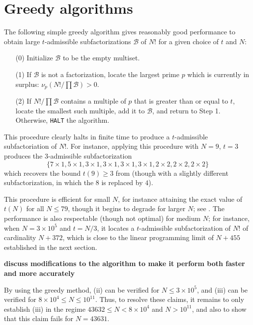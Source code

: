 \documentclass[12pt,a4paper,reqno]{amsart}
\numberwithin{equation}{section}
\theoremstyle{plain}
\theoremstyle{definition}
\newcommand\tuple{{\mathcal B}}
\begin{document}
\section{Greedy algorithms}\label{greedy-sec}

The following simple greedy algorithm gives reasonably good performance to obtain large $t$-admissible subfactorizations $\tuple$ of $N!$ for a given choice of $t$ and $N$:

\begin{enumerate}
\item[(0)] Initialize $\tuple$ to be the empty multiset. 
\item[(1)] If $\tuple$ is not a factorization, locate the largest prime $p$ which is currently in surplus: $\nu_p(N!/\prod \tuple) > 0$. 
\item[(2)] If $N! / \prod \tuple$ contains a multiple of $p$ that is greater than or equal to $t$, locate the smallest such multiple, add it to $\tuple$, and return to Step 1.  Otherwise, \texttt{HALT} the algorithm. 
\end{enumerate}

This procedure clearly halts in finite time to produce a $t$-admissible subfactoriation of $N!$.  For instance, applying this procedure with $N=9$, $t=3$ produces the $3$-admissible subfactorization
$$ \{7 \times 1, 5 \times 1, 3 \times 1, 3 \times 1, 3 \times 1, 3 \times 1, 2 \times 2, 2 \times 2, 2 \times 2 \}$$
which recovers the bound $t(9) \geq 3$ from  (though with a slightly different subfactorization, in which the $8$ is replaced by $4$).

This procedure is efficient for small $N$, for instance attaining the exact value of $t(N)$ for all $N \leq 79$, though it begins to degrade for larger $N$; see .  The performance is also respectable (though not optimal) for medium $N$; for instance, when $N=3 \times 10^5$ and $t=N/3$, it locates a $t$-admissible subfactorization of $N!$ of cardinality $N+372$, which is close to the linear programming limit of $N+455$ established in the next section.

{\bf discuss modifications to the algorithm to make it perform both faster and more accurately}

By using the greedy method, (ii) can be verified for $N \leq 3 \times 10^5$, and (iii) can be verified for $8 \times 10^4 \leq N \leq 10^{11}$.    Thus, to resolve these claims, it remains to only establish (iii) in the regime $43632 \leq N < 8 \times 10^4$ and $N > 10^{11}$, and also to show that this claim fails for $N=43631$.
\end{document}
